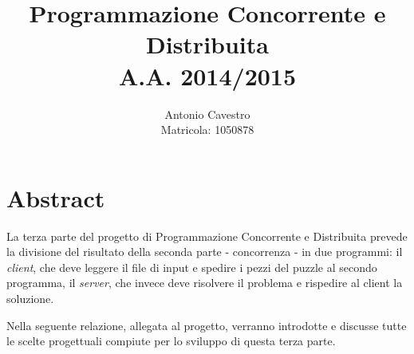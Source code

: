 \documentclass[a4paper, 12pt]{article}
\title{Programmazione Concorrente e Distribuita \\ A.A. 2014/2015 \\
\vspace{2 mm}{\small PuzzleSolver - Parte 3}}
\author{Antonio Cavestro \\ \vspace{2 mm} {\small Matricola: 1050878}}
\date{}
\begin{document}
\maketitle

\section{Abstract}

La terza parte del progetto di Programmazione Concorrente e Distribuita
prevede la divisione del risultato della seconda parte - concorrenza - in due
programmi: il \emph{client}, che deve leggere il file di input e spedire i pezzi
del puzzle al secondo programma, il \emph{server}, che invece deve risolvere
il problema e rispedire al client la soluzione.

Nella seguente relazione, allegata al progetto, verranno introdotte e discusse
tutte le scelte progettuali compiute per lo sviluppo di questa terza parte.



\end{document}
